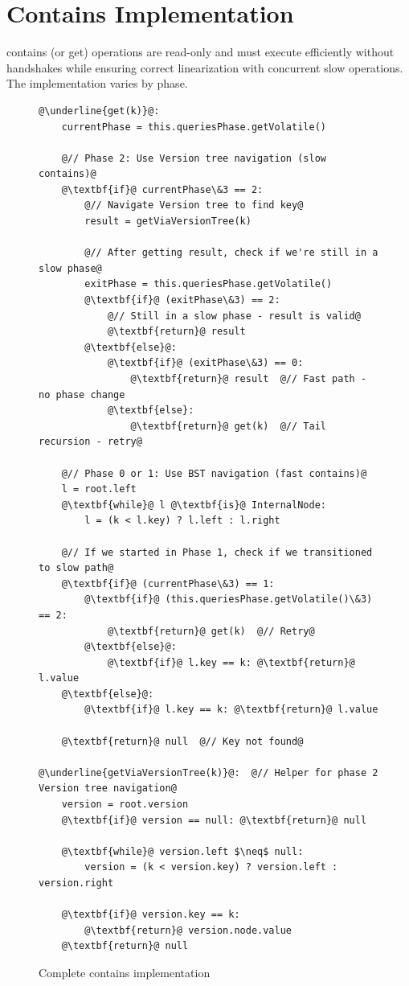 \documentclass[acmsmall,screen,nonacm]{acmart}
\newcommand{\codestyle}[1]{{{\fontsize{9}{10}\ttfamily #1}}}
\begin{document}
\section{Contains Implementation}

\codestyle{contains} (or \codestyle{get}) operations are read-only and must execute efficiently without handshakes while ensuring correct linearization with concurrent slow operations. The implementation varies by phase.


\begin{figure}[H]
\begin{lstlisting}
@\underline{get(k)}@:
    currentPhase = this.queriesPhase.getVolatile()
    
    @// Phase 2: Use Version tree navigation (slow contains)@
    @\textbf{if}@ currentPhase\&3 == 2:
        @// Navigate Version tree to find key@
        result = getViaVersionTree(k)
        
        @// After getting result, check if we're still in a slow phase@
        exitPhase = this.queriesPhase.getVolatile()
        @\textbf{if}@ (exitPhase\&3) == 2:
            @// Still in a slow phase - result is valid@
            @\textbf{return}@ result
        @\textbf{else}@:
            @\textbf{if}@ (exitPhase\&3) == 0:
                @\textbf{return}@ result  @// Fast path - no phase change
            @\textbf{else}:
                @\textbf{return}@ get(k)  @// Tail recursion - retry@
    
    @// Phase 0 or 1: Use BST navigation (fast contains)@
    l = root.left
    @\textbf{while}@ l @\textbf{is}@ InternalNode:
        l = (k < l.key) ? l.left : l.right
    
    @// If we started in Phase 1, check if we transitioned to slow path@
    @\textbf{if}@ (currentPhase\&3) == 1:
        @\textbf{if}@ (this.queriesPhase.getVolatile()\&3) == 2:
            @\textbf{return}@ get(k)  @// Retry@
        @\textbf{else}@:
            @\textbf{if}@ l.key == k: @\textbf{return}@ l.value
    @\textbf{else}@:
        @\textbf{if}@ l.key == k: @\textbf{return}@ l.value
    
    @\textbf{return}@ null  @// Key not found@

@\underline{getViaVersionTree(k)}@:  @// Helper for phase 2 Version tree navigation@
    version = root.version
    @\textbf{if}@ version == null: @\textbf{return}@ null
    
    @\textbf{while}@ version.left $\neq$ null:
        version = (k < version.key) ? version.left : version.right
    
    @\textbf{if}@ version.key == k:
        @\textbf{return}@ version.node.value
    @\textbf{return}@ null
\end{lstlisting}
\caption{Complete contains implementation}
\label{fig:contains-complete}
\end{figure}
\end{document}
